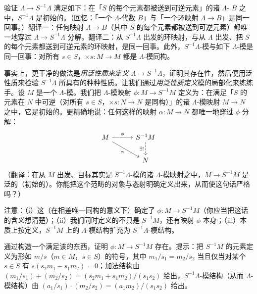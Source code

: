 \begin{exercise}\label{ex:rings-localization-universal-property}
验证 $\Lambda\to S^{-1}\Lambda$ 满足如下\trUniversalProperty：在「$S$ 的每个元素都被送到可逆元素」的诸 $\Lambda$-\trAlgebra{} $B$ 之中，$S^{-1}\Lambda$ 是初始的。（回忆：「一个 $\Lambda$-代数 $B$」与「一个环映射 $\Lambda\to B$」是同一回事。）翻译一：任何映射 $\Lambda\to B$（其中 $S$ 的每个元素都被送到可逆元素）都唯一地穿过 $\Lambda\to S^{-1}\Lambda$ 分解。翻译二：从 $S^{-1}\Lambda$ 出发的环映射，与从 $\Lambda$ 出发、把 $S$ 的每个元素都送到可逆元素的环映射，是同一回事。此外，$S^{-1}\Lambda$-模与如下 $\Lambda$-模是同一回事：对所有 $s\in S$，$\times s\colon M\to M$ 都是 $\Lambda$-模同构。
\end{exercise}

事实上，更干净的做法是\emph{用泛性质来定义} $\Lambda\to S^{-1}\Lambda$，证明其存在性，然后便用泛性质来检验 $S^{-1}\Lambda$ 所具有的种种性质。让我们通过\emph{用泛性质定义}模的局部化来练练手。设 $M$ 是一个 $\Lambda$-模。我们把 $\Lambda$-模映射 $\phi\colon M\to S^{-1}M$ 定义为：在满足「$S$ 的元素在 $N$ 中可逆（对所有 $s\in S$，$\times s\colon N\to N$ 是同构）」的诸 $\Lambda$-模映射 $M\to N$ 之中，它是初始的。更精确地说：任何这样的映射 $\alpha\colon M\to N$ 都唯一地穿过 $\phi$ 分解：
\[
\begin{tikzcd}[row sep=1.9em, column sep=3em]
M \ar[r,"\phi"] \ar[dr,"\alpha"'] & S^{-1}M \ar[d,dashed,"\exists!"'] \\
 & N
\end{tikzcd}
\]
（翻译：在从 $M$ 出发、目标其实是 $S^{-1}\Lambda$-模的诸 $\Lambda$-模映射之中，$M\to S^{-1}M$ 是泛的（初始的）。你能把这个范畴的对象与态射明确定义出来，从而使这句话严格吗？）

注意：（i）这（在相差唯一同构的意义下）确定了 $\phi\colon M\to S^{-1}M$（你应当把这话的含义想清楚）；（ii）我们同时定义的不只是 $S^{-1}M$，还有映射 $\phi$ 本身；（iii）本质上按定义，$S^{-1}M$ 上的 $\Lambda$-模结构扩充为 $S^{-1}\Lambda$-模结构。

\begin{exercise}\label{ex:module-localization-explicit-construction}
通过构造一个满足该\trUniversalProperty{}的东西，证明 $\phi\colon M\to S^{-1}M$ 存在。提示：把 $S^{-1}M$ 的元素定义为形如 $m/s$（$m\in M$，$s\in S$）的符号，其中 $m_1/s_1=m_2/s_2$ 当且仅当对某个 $s\in S$ 有 $s(s_2m_1-s_1m_2)=0$；加法结构由 $(m_1/s_1)+(m_2/s_2)=(s_2m_1+s_1m_2)/(s_1s_2)$ 给出，$S^{-1}\Lambda$-模结构（从而 $\Lambda$-模结构）由 $(a_1/s_1)\cdot(m_2/s_2)=(a_1m_2)/(s_1s_2)$ 给出。
\end{exercise}

